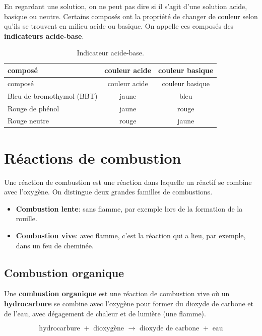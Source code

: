 \documentclass[
  11pt,
  a4paper,
  openany]{book}
\providecommand{\tightlist}{%
  \setlength{\itemsep}{0pt}\setlength{\parskip}{0pt}}
\begin{document}
En regardant une solution, on ne peut pas dire si il s'agit d'une solution acide, basique ou neutre. Certains composés ont la propriété de changer de couleur selon qu'ils se trouvent en milieu acide ou basique. On appelle ces composés des \textbf{indicateurs acide-base}.

\begin{longtable}[]{@{}lcc@{}}
\caption{\label{tab:indicateur-acide-base} Indicateur acide-base.}\tabularnewline
\toprule()
composé & couleur acide & couleur basique \\
\midrule()
\endfirsthead
\toprule()
composé & couleur acide & couleur basique \\
\midrule()
\endhead
Bleu de bromothymol (BBT) & jaune & bleu \\
Rouge de phénol & jaune & rouge \\
Rouge neutre & rouge & jaune \\
\bottomrule()
\end{longtable}

\hypertarget{ruxe9actions-de-combustion}{%
\section{Réactions de combustion}\label{ruxe9actions-de-combustion}}

Une réaction de combustion est une réaction dans laquelle un réactif se combine avec l'oxygène. On distingue deux grandes familles de combustions.

\begin{itemize}
\tightlist
\item
  \textbf{Combustion lente}: sans flamme, par exemple lors de la formation de la rouille.
\item
  \textbf{Combustion vive}: avec flamme, c'est la réaction qui a lieu, par exemple, dans un feu de cheminée.
\end{itemize}

\hypertarget{combustion-organique}{%
\subsection{Combustion organique}\label{combustion-organique}}

Une \textbf{combustion organique} est une réaction de combustion vive où un \textbf{hydrocarbure} se combine avec l'oxygène pour former du dioxyde de carbone et de l'eau, avec dégagement de chaleur et de lumière (une flamme).

\[ \text{hydrocarbure } + \text{ dioxygène } \longrightarrow \text{ dioxyde de carbone } + \text{ eau} \]
\end{document}
